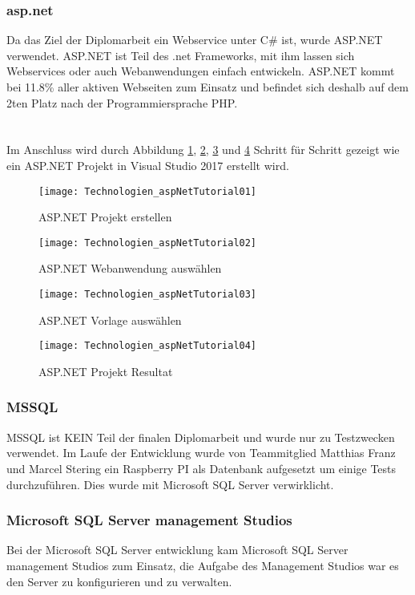 \subsubsection {asp.net}
\label{sec:asp.net}
Da das Ziel der Diplomarbeit ein Webservice unter C\# ist, wurde ASP.NET verwendet. ASP.NET ist Teil des .net Frameworks, mit ihm lassen sich Webservices oder auch Webanwendungen einfach entwickeln. ASP.NET kommt bei 11.8\% aller aktiven Webseiten zum Einsatz und befindet sich deshalb auf dem 2ten Platz nach der Programmiersprache PHP. \\ \cite{aspnetstatistik} \\
\\ Im Anschluss wird durch Abbildung \ref{fig:aspNetTut01}, \ref{fig:aspNetTut02}, \ref{fig:aspNetTut03} und \ref{fig:aspNetTut04} Schritt für Schritt gezeigt wie ein ASP.NET Projekt in Visual Studio 2017 erstellt wird.
\begin{figure}[h]
    \texttt{[image: Technologien\_aspNetTutorial01]}
    \caption{ASP.NET Projekt erstellen}
    \label{fig:aspNetTut01}
\end{figure}
\begin{figure}[h]
    \texttt{[image: Technologien\_aspNetTutorial02]}
    \caption{ASP.NET Webanwendung auswählen}
    \label{fig:aspNetTut02}
\end{figure}
\begin{figure}[H]
    \texttt{[image: Technologien\_aspNetTutorial03]}
    \caption{ASP.NET Vorlage auswählen}
    \label{fig:aspNetTut03}
\end{figure}
\begin{figure}[h]
    \texttt{[image: Technologien\_aspNetTutorial04]}
    \caption{ASP.NET Projekt Resultat}
    \label{fig:aspNetTut04}
\end{figure}
\subsubsection {MSSQL}
\label{sec:MSSQL}
MSSQL ist KEIN Teil der finalen Diplomarbeit und wurde nur zu Testzwecken verwendet. Im Laufe der Entwicklung wurde von Teammitglied Matthias Franz und Marcel Stering ein Raspberry PI als Datenbank aufgesetzt um einige Tests durchzuführen. Dies wurde mit Microsoft SQL Server verwirklicht. 
\subsubsection {Microsoft SQL Server management Studios}
\label{sec:mssql-server-management-studio}
Bei der Microsoft SQL Server entwicklung kam Microsoft SQL Server management Studios zum Einsatz, die Aufgabe des Management Studios war es den Server zu konfigurieren und zu verwalten. 
